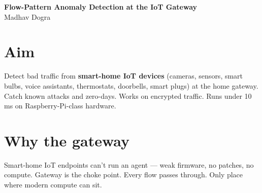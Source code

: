 \documentclass[11pt,a4paper]{article}
\begin{document}
\begin{center}
{\Large\bfseries Flow-Pattern Anomaly Detection at the IoT Gateway} \\[2pt]
{\small Madhav Dogra}
\end{center}

\vspace{-4pt}

\section{Aim}
Detect bad traffic from \textbf{smart-home IoT devices} (cameras, sensors, smart bulbs, voice assistants, thermostats, doorbells, smart plugs) at the home gateway. Catch known attacks and zero-days. Works on encrypted traffic. Runs under 10\,ms on Raspberry-Pi-class hardware.

\section{Why the gateway}
Smart-home IoT endpoints can't run an agent --- weak firmware, no patches, no compute. Gateway is the choke point. Every flow passes through. Only place where modern compute can sit.
\end{document}
